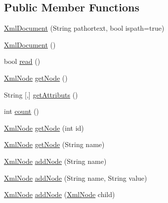 \subsection*{Public Member Functions}
\begin{DoxyCompactItemize}
\item 
\mbox{\hyperlink{class_n_t_k_1_1_i_o_1_1_xml_1_1_xml_document_a87e102a1dd9f36c78376b7d9a1af94c0}{Xml\+Document}} (String pathortext, bool ispath=true)
\item 
\mbox{\hyperlink{class_n_t_k_1_1_i_o_1_1_xml_1_1_xml_document_ad371e7ef6ce5ddb1776a98c9b9d66dc1}{Xml\+Document}} ()
\item 
bool \mbox{\hyperlink{class_n_t_k_1_1_i_o_1_1_xml_1_1_xml_document_a66ae1e70562280d8b212037433f7b2db}{read}} ()
\item 
\mbox{\hyperlink{class_n_t_k_1_1_i_o_1_1_xml_1_1_xml_node}{Xml\+Node}} \mbox{\hyperlink{class_n_t_k_1_1_i_o_1_1_xml_1_1_xml_document_accfdd41b8ec76935fc78769a0350a032}{get\+Node}} ()
\item 
String \mbox{[},\mbox{]} \mbox{\hyperlink{class_n_t_k_1_1_i_o_1_1_xml_1_1_xml_document_ae772dda265445df9b1a4bc3259e9dfaa}{get\+Attributs}} ()
\item 
int \mbox{\hyperlink{class_n_t_k_1_1_i_o_1_1_xml_1_1_xml_document_a81b13574f06640144f5b40f9020d8050}{count}} ()
\item 
\mbox{\hyperlink{class_n_t_k_1_1_i_o_1_1_xml_1_1_xml_node}{Xml\+Node}} \mbox{\hyperlink{class_n_t_k_1_1_i_o_1_1_xml_1_1_xml_document_ac7b2b82c1e6c129f22381f99a72a175d}{get\+Node}} (int id)
\item 
\mbox{\hyperlink{class_n_t_k_1_1_i_o_1_1_xml_1_1_xml_node}{Xml\+Node}} \mbox{\hyperlink{class_n_t_k_1_1_i_o_1_1_xml_1_1_xml_document_aef6f8f86ec604204c7e70d21d6f53b32}{get\+Node}} (String name)
\item 
\mbox{\hyperlink{class_n_t_k_1_1_i_o_1_1_xml_1_1_xml_node}{Xml\+Node}} \mbox{\hyperlink{class_n_t_k_1_1_i_o_1_1_xml_1_1_xml_document_a24e804c34688d0171a15864a5d01d8e8}{add\+Node}} (String name)
\item 
\mbox{\hyperlink{class_n_t_k_1_1_i_o_1_1_xml_1_1_xml_node}{Xml\+Node}} \mbox{\hyperlink{class_n_t_k_1_1_i_o_1_1_xml_1_1_xml_document_a78213bc10fa71ceb814f2d3b6db4fa1c}{add\+Node}} (String name, String value)
\item 
\mbox{\hyperlink{class_n_t_k_1_1_i_o_1_1_xml_1_1_xml_node}{Xml\+Node}} \mbox{\hyperlink{class_n_t_k_1_1_i_o_1_1_xml_1_1_xml_document_a595999ed34085d2dbf514dea6dcc61aa}{add\+Node}} (\mbox{\hyperlink{class_n_t_k_1_1_i_o_1_1_xml_1_1_xml_node}{Xml\+Node}} child)

\end{DoxyCompactItemize}
